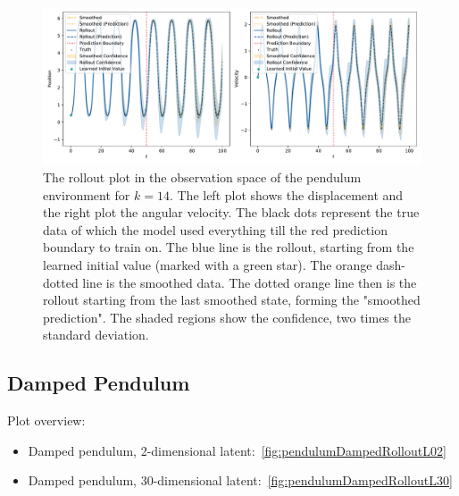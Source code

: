 		\begin{figure}
			\centering
			\includegraphics[width=\linewidth]{figures/results/pendulum/run-latent-dim-14/rollout-observations-N0.pdf}
			\caption[Rollout of the pendulum experiment for 14 latent dimensions]{The rollout plot in the observation space of the pendulum environment for \(k = 14\). The left plot shows the displacement and the right plot the angular velocity. The black dots represent the true data of which the model used everything till the red prediction boundary to train on. The blue line is the rollout, starting from the learned initial value (marked with a green star). The orange dash-dotted line is the smoothed data. The dotted orange line then is the rollout starting from the last smoothed state, forming the "smoothed prediction". The shaded regions show the confidence, \ie two times the standard deviation.}
			\label{fig:pendulumRolloutL14}
		\end{figure}

	\subsection{Damped Pendulum}
		Plot overview:
		\begin{itemize}
			\item Damped pendulum, 2-dimensional latent:~\autoref{fig:pendulumDampedRolloutL02}
			\item Damped pendulum, 30-dimensional latent:~\autoref{fig:pendulumDampedRolloutL30}
		\end{itemize}

